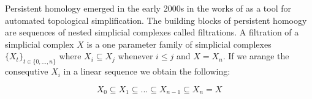 Persistent homology emerged in the early 2000s in the works of \cite{persistence-original} as a tool for automated topological simplification. The building blocks of persistent homoogy are sequences of nested simplicial complexes called filtrations. A filtration of a simplicial complex $X$ is a one parameter family of simplicial complexes $\{X_t\}_{t \in \{0, ..., n\}}$ where $X_i \subseteq X_j$ whenever $i \le j$ and $X = X_n$. If we arange the consequtive $X_i$ in a linear sequence we obtain the following:


$$ X_0 \subseteq X_1 \subseteq ... \subseteq X_{n-1} \subseteq X_n = X$$

